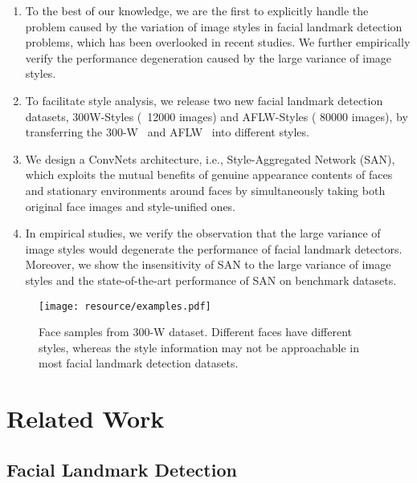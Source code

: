 \documentclass[10pt,twocolumn,letterpaper]{article}
\begin{document}
\begin{enumerate}
\item To the best of our knowledge, we are the first to explicitly handle the problem caused by the variation of image styles in facial landmark detection problems, which has been overlooked in recent studies.
We further empirically verify the performance degeneration caused by the large variance of image styles.
    
\item To facilitate style analysis, we release two new facial landmark detection datasets, 300W-Styles (~12000 images) and AFLW-Styles ( 80000 images), by transferring the 300-W~\cite{sagonas2013300} and AFLW~\cite{koestinger2011annotated} into different styles.

\item We design a ConvNets architecture, i.e., Style-Aggregated Network (SAN), which exploits the mutual benefits of genuine appearance contents of faces and stationary environments around faces by simultaneously taking both original face images and style-unified ones.

\item In empirical studies, we verify the observation that the large variance of image styles would degenerate the performance of facial landmark detectors. 
Moreover, we show the insensitivity of SAN to the large variance of image styles and the state-of-the-art performance of SAN on benchmark datasets.
\end{enumerate}




\begin{figure}[t]
\center
\texttt{[image: resource/examples.pdf]}
\caption{
Face samples from 300-W dataset. Different faces have different styles, whereas the style information may not be approachable in most facial landmark detection datasets.
}
\label{fig:examples}
\end{figure}



\section{Related Work}

\subsection{Facial Landmark Detection}
\end{document}
